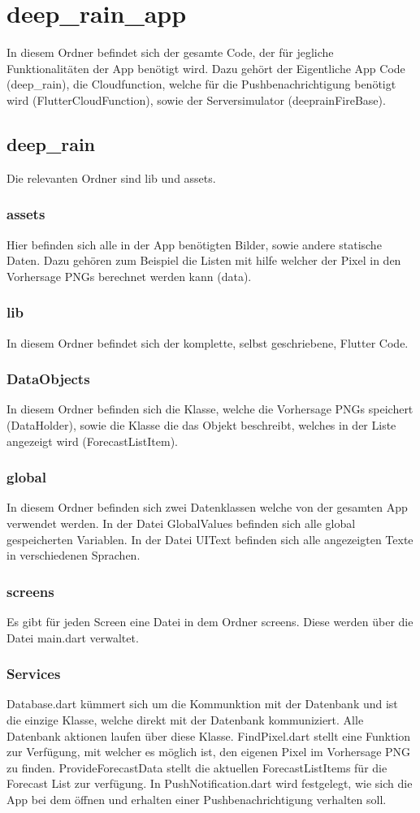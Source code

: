 \section{deep\_rain\_app}
In diesem Ordner befindet sich der gesamte Code, der für jegliche Funktionalitäten der App benötigt wird. 
Dazu gehört der Eigentliche App Code (deep\_rain), die Cloudfunction, welche für die Pushbenachrichtigung benötigt wird (FlutterCloudFunction),
sowie der Serversimulator (deeprainFireBase). 

\subsection{deep\_rain}
Die relevanten Ordner sind lib und assets. 
\subsubsection{assets}
Hier befinden sich alle in der App benötigten Bilder, sowie andere statische Daten. 
Dazu gehören zum Beispiel die Listen mit hilfe welcher der Pixel in den Vorhersage PNGs berechnet werden kann (data). 

\subsubsection{lib}
In diesem Ordner befindet sich der komplette, selbst geschriebene, Flutter Code. 
\subsubsection*{DataObjects}
In diesem Ordner befinden sich die Klasse, welche die Vorhersage PNGs speichert (DataHolder), sowie
die Klasse die das Objekt beschreibt, welches in der Liste angezeigt wird (ForecastListItem).
\subsubsection*{global}
In diesem Ordner befinden sich zwei Datenklassen welche von der gesamten App verwendet werden. 
In der Datei GlobalValues befinden sich alle global gespeicherten Variablen.
In der Datei UIText befinden sich alle angezeigten Texte in verschiedenen Sprachen. 
\subsubsection*{screens}
Es gibt für jeden Screen eine Datei in dem Ordner screens. Diese werden über die Datei main.dart verwaltet. 
\subsubsection*{Services}
Database.dart kümmert sich um die Kommunktion mit der Datenbank und ist die einzige Klasse, welche direkt mit der Datenbank 
kommuniziert. Alle Datenbank aktionen laufen über diese Klasse. 
FindPixel.dart stellt eine Funktion zur Verfügung, mit welcher es möglich ist, den eigenen Pixel im Vorhersage PNG zu finden. 
ProvideForecastData stellt die aktuellen ForecastListItems für die Forecast List zur verfügung. 
In PushNotification.dart wird festgelegt, wie sich die App bei dem öffnen und erhalten einer Pushbenachrichtigung verhalten soll. 
